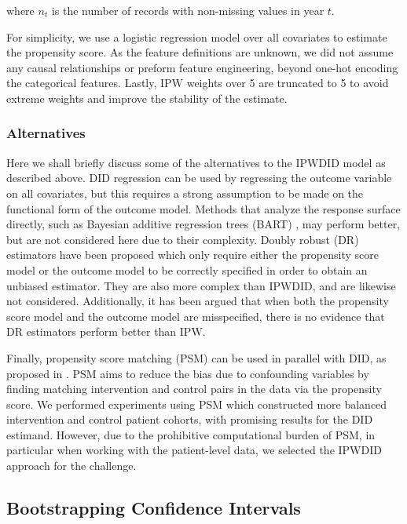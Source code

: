 \documentclass[twoside,11pt]{article}
\newcommand*{\DID}{\ensuremath{\text{DID}}\xspace}
\newcommand*{\IPW}{\ensuremath{\text{IPW}}\xspace}
\newcommand*{\IPWDID}{\ensuremath{\text{IPWDID}}\xspace}
\begin{document}
\noindent where $n_{t}$ is the number of records with non-missing values in year $t$.

For simplicity, we use a logistic regression model over all covariates to estimate the propensity score.
As the feature definitions are unknown,
we did not assume any causal relationships or preform feature engineering,
beyond one-hot encoding the categorical features.
Lastly, \IPW weights over 5 are truncated to 5
to avoid extreme weights and improve the stability of the estimate.

\subsubsection{Alternatives}
\label{method:IPWDID:alternatives}

Here we shall briefly discuss some of the alternatives to the \IPWDID model as described above.
\DID regression can be used by regressing the outcome variable on all covariates,
but this requires a strong assumption to be made on the functional form of the outcome model.
Methods that analyze the response surface directly,
such as Bayesian additive regression trees (BART) \cite{Hill2011Bayesian},
may perform better, but are not considered here due to their complexity.
Doubly robust (DR) estimators have been proposed \cite{SANTANNA2020101,10.2307/27645858,10.1093/aje/kwq439}
which only require either the propensity score model or the outcome model to be correctly specified in order to obtain an unbiased estimator.
They are also more complex than \IPWDID, and are likewise not considered.
Additionally, it has been argued that when both the propensity score model and the outcome model are misspecified,
there is no evidence that DR estimators perform better than \IPW \cite{10.3389/fphar.2019.00973}.

Finally, propensity score matching (PSM) can be used in parallel with \DID,
as proposed in \cite{10.1111/0034-6527.00321}.
PSM aims to reduce the bias due to confounding variables
by finding matching intervention and control pairs in the data via the propensity score.
We performed experiments using PSM which constructed
more balanced intervention and control patient cohorts,
with promising results for the \DID estimand.
However, due to the prohibitive computational burden of PSM,
in particular when working with the patient-level data,
we selected the \IPWDID approach for the challenge.

\subsection{Bootstrapping Confidence Intervals}
\label{method:CI}
\end{document}
